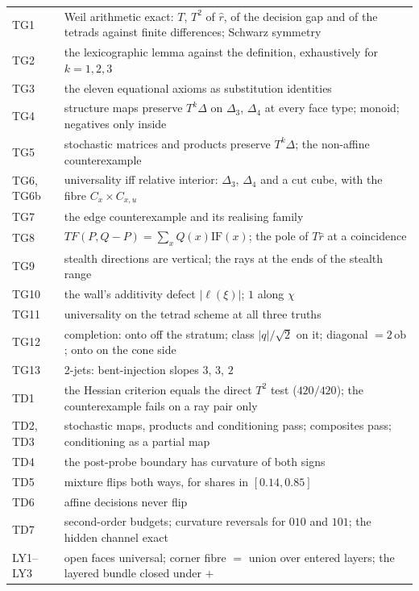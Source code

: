 \documentclass[11pt]{article}
\theoremstyle{definition}\newtheorem{definition}[theorem]{Definition}\newtheorem{remark}[theorem]{Remark}\newtheorem{example}[theorem]{Example}
\begin{document}
\begin{center}\small
\begin{tabular}{lp{}}\toprule
TG1 & Weil arithmetic exact: $T$, $T^2$ of $\hat r$, of the decision gap and of the tetrads against finite differences; Schwarz symmetry\\
TG2 & the lexicographic lemma against the definition, exhaustively for $k=1,2,3$\\
TG3 & the eleven equational axioms as substitution identities\\
TG4 & structure maps preserve $T^k\Delta$ on $\Delta_3$, $\Delta_4$ at every face type; monoid; negatives only inside\\
TG5 & stochastic matrices and products preserve $T^k\Delta$; the non-affine counterexample\\
TG6, TG6b & universality iff relative interior: $\Delta_3$, $\Delta_4$ and a cut cube, with the fibre $C_x\times C_{x,u}$\\
TG7 & the edge counterexample and its realising family\\
TG8 & $T F(P,Q-P)=\sum_xQ(x)\mathrm{IF}(x)$; the pole of $T\hat r$ at a coincidence\\
TG9 & stealth directions are vertical; the rays at the ends of the stealth range\\
TG10 & the wall's additivity defect $|\ell(\xi)|$; $1$ along $\chi$\\
TG11 & universality on the tetrad scheme at all three truths\\
TG12 & completion: onto off the stratum; class $|q|/\sqrt2$ on it; diagonal $=2\,\mathrm{ob}$; onto on the cone side\\
TG13 & 2-jets: bent-injection slopes $3$, $3$, $2$\\\midrule
TD1 & the Hessian criterion equals the direct $T^2$ test ($420/420$); the counterexample fails on a ray pair only\\
TD2, TD3 & stochastic maps, products and conditioning pass; composites pass; conditioning as a partial map\\
TD4 & the post-probe boundary has curvature of both signs\\
TD5 & mixture flips both ways, for shares in $[0.14,0.85]$\\
TD6 & affine decisions never flip\\
TD7 & second-order budgets; curvature reversals for $010$ and $101$; the hidden channel exact\\\midrule
LY1--LY3 & open faces universal; corner fibre $=$ union over entered layers; the layered bundle closed under $+$\\

\end{tabular}
\end{center}
\end{document}
